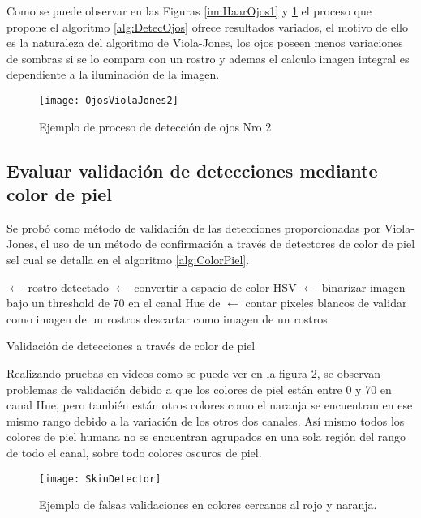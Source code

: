 Como se puede observar en las Figuras \ref{im:HaarOjos1} y \ref{im:HaarOjos2} el proceso que propone el algoritmo \ref{alg:DetecOjos} ofrece resultados variados, el motivo de ello es la naturaleza del algoritmo de Viola-Jones, los ojos poseen menos variaciones de sombras si se lo compara con un rostro y ademas el calculo imagen integral es dependiente a la iluminación de la imagen.

\begin{figure}[h]
	\centering
    \texttt{[image: OjosViolaJones2]}
    \caption{Ejemplo de proceso de detección de ojos Nro 2}
    \label{im:HaarOjos2}
\end{figure}

\subsection{Evaluar validación de detecciones mediante color de piel}
Se probó como método de validación de las detecciones proporcionadas por Viola-Jones, el uso de un método de confirmación a través de detectores de color de piel sel cual se detalla en el algoritmo \ref{alg:ColorPiel}.

\begin{algorithm}[h]
 $\gets$ rostro detectado\;
 $\gets$ convertir  a espacio de color HSV\;
 $\gets$ binarizar imagen bajo un threshold de 70 en el canal Hue de \;
 $\gets$ contar pixeles blancos de \;
{
	validar  como imagen de un rostros\;
}
{
	descartar  como imagen de un rostros\;
}
\caption{Validación de detecciones a través de color de piel}
\label{alg:ColorPiel}
\end{algorithm}

Realizando pruebas en videos como se puede ver en la figura \ref{im:skinDetector}, se observan problemas de validación debido a que los colores de piel están entre 0 y 70 en canal Hue, pero también están otros colores como el naranja se encuentran en ese mismo rango debido a la variación de los otros dos canales. Así mismo todos los colores de piel humana no se encuentran agrupados en una sola región del rango de todo el canal, sobre todo colores oscuros de piel.
\begin{figure}[h]
	\centering
    \texttt{[image: SkinDetector]}
    \caption{Ejemplo de falsas validaciones en colores cercanos al rojo y naranja.}
    \label{im:skinDetector}
\end{figure}

